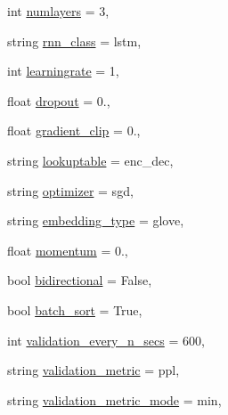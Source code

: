 \begin{DoxyCompactItemize}
\item 
int \hyperlink{namespaceprojects_1_1twitter_1_1seq2seq_1_1train_ab8a337bdf9649b021f8387b6b0821769}{numlayers} = 3,
\item 
string \hyperlink{namespaceprojects_1_1twitter_1_1seq2seq_1_1train_ab7020645317af2e2628cbd73c47817ec}{rnn\+\_\+class} = \textquotesingle{}lstm\textquotesingle{},
\item 
int \hyperlink{namespaceprojects_1_1twitter_1_1seq2seq_1_1train_ae9ca49b979fa7f061a7178b2c7261aca}{learningrate} = 1,
\item 
float \hyperlink{namespaceprojects_1_1twitter_1_1seq2seq_1_1train_a66ba4bf85bb60bc0bf406d98e9e6e094}{dropout} = 0.,
\item 
float \hyperlink{namespaceprojects_1_1twitter_1_1seq2seq_1_1train_a25a7654cadef4df1b15fd3d71e943567}{gradient\+\_\+clip} = 0.,
\item 
string \hyperlink{namespaceprojects_1_1twitter_1_1seq2seq_1_1train_a3ad45597aff971f21c4a81ee5b3ec172}{lookuptable} = \textquotesingle{}enc\+\_\+dec\textquotesingle{},
\item 
string \hyperlink{namespaceprojects_1_1twitter_1_1seq2seq_1_1train_a97da24fe12e51b5590517a22a75bb386}{optimizer} = \textquotesingle{}sgd\textquotesingle{},
\item 
string \hyperlink{namespaceprojects_1_1twitter_1_1seq2seq_1_1train_a530a3f3bc45d74b72da763862925d708}{embedding\+\_\+type} = \textquotesingle{}glove\textquotesingle{},
\item 
float \hyperlink{namespaceprojects_1_1twitter_1_1seq2seq_1_1train_af79c07300e5e9ad9f72bef461af4a7d4}{momentum} = 0.,
\item 
bool \hyperlink{namespaceprojects_1_1twitter_1_1seq2seq_1_1train_a7111bb3517979023cb97a6b8aa310210}{bidirectional} = False,
\item 
bool \hyperlink{namespaceprojects_1_1twitter_1_1seq2seq_1_1train_a4119f78ff288b9c466b3c2308f42e4c8}{batch\+\_\+sort} = True,
\item 
int \hyperlink{namespaceprojects_1_1twitter_1_1seq2seq_1_1train_aff2bbd1ef43066313e7cac8782434683}{validation\+\_\+every\+\_\+n\+\_\+secs} = 600,
\item 
string \hyperlink{namespaceprojects_1_1twitter_1_1seq2seq_1_1train_a609df39637e100806bbf087075f28e39}{validation\+\_\+metric} = \textquotesingle{}ppl\textquotesingle{},
\item 
string \hyperlink{namespaceprojects_1_1twitter_1_1seq2seq_1_1train_a2cd8da9b80bc404eb4aa03d0d7a5ddb9}{validation\+\_\+metric\+\_\+mode} = \textquotesingle{}min\textquotesingle{},

\end{DoxyCompactItemize}
